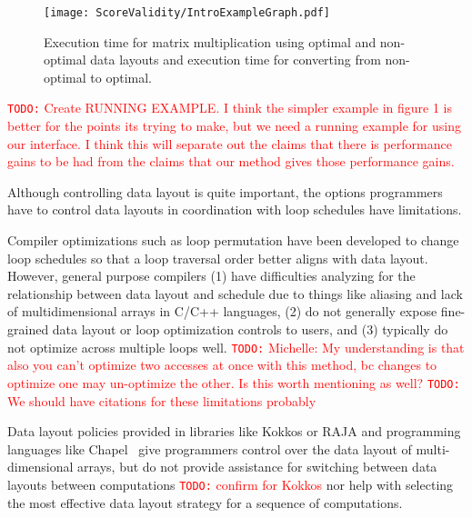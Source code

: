 \documentclass[sigconf, table]{acmart}
\newcommand{\todo}[1]{{\textcolor{red}{{\tt{TODO:}}\,\,#1 }}}
\begin{document}
\begin{figure}
	\texttt{[image: ScoreValidity/IntroExampleGraph.pdf]}
	\caption{Execution time for matrix multiplication using optimal and non-optimal data layouts and execution time for converting from non-optimal to optimal.}
	\label{IntroExample}
\end{figure}

\todo{Create RUNNING EXAMPLE. I think the simpler example in figure 1 is better for the points its trying to make, but we need a running example for using our interface. I think this will separate out the claims that there is performance gains to be had from the claims that our method gives those performance gains. }


Although controlling data layout is quite important, the options programmers have to control
data layouts in coordination with loop schedules have limitations.

Compiler optimizations such as loop permutation have been developed to change loop
schedules so that a loop traversal order better aligns with data layout.
However, general purpose compilers (1) have difficulties analyzing for the relationship between
data layout and schedule due to things like aliasing and lack of multidimensional arrays in 
C/C++ languages, (2) do not generally expose fine-grained data layout or loop optimization
controls to users, and (3) typically do not optimize across multiple loops well.
\todo{Michelle: My understanding is that also you can't optimize two accesses at once with this method, bc changes to optimize one may un-optimize the other. Is this worth mentioning as well?}
\todo{We should have citations for these limitations probably}

Data layout policies provided in libraries like Kokkos or RAJA
and programming languages like Chapel~\cite{diaconescu2007approach} give
programmers control over the data layout of multi-dimensional arrays, but do not 
provide assistance for switching between data layouts between computations \todo{confirm for Kokkos}
nor help with selecting the most effective data layout strategy for a sequence of computations.
\end{document}
